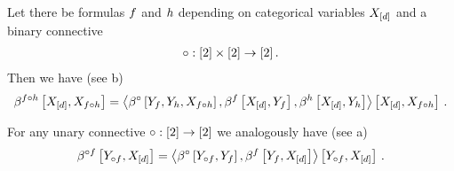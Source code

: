 Let there be formulas $f$ and $h$ depending on categorical variables $X_{[d]}$ and a binary connective
\begin{align*}
    \circ: [2]\times[2] \rightarrow[2] \, .
\end{align*}
Then we have (see b)
\begin{align*}
    \beta^{f\circ h}\left[X_{[d]},X_{f\circ h}\right]
    = \left\langle 
        \beta^{\circ}\left[Y_{f},Y_{h},X_{f\circ h}\right],
        \beta^{f}\left[X_{[d]},Y_{f}\right],
        \beta^{h}\left[X_{[d]},Y_{h}\right]
    \right\rangle \left[ 
        X_{[d]},X_{f\circ h}
     \right] \, .
\end{align*}


For any unary connective $\circ: [2] \rightarrow[2]$ we analogously have (see a)
\begin{align*}
    \beta^{\circ f}\left[Y_{\circ f},X_{[d]}\right]
    = \left\langle 
        \beta^{\circ}\left[Y_{\circ f},Y_{f}\right],
        \beta^{f}\left[Y_{f},X_{[d]}\right]
    \right\rangle \left[ Y_{\circ f},X_{[d]} \right] \, .
\end{align*}

